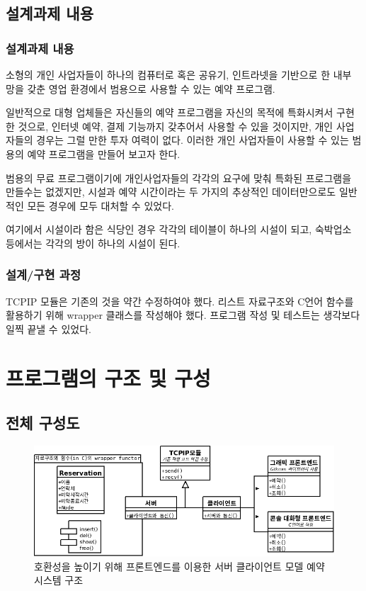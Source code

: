 \documentclass[12pt,a4paper]{report}
\begin{document}
\section{설계과제 내용}
\subsection{설계과제 내용}
소형의 개인 사업자들이 하나의 컴퓨터로 혹은 공유기, 인트라넷을 기반으로 한 내부 망을 갖춘 영업 환경에서 범용으로 사용할 수 있는 예약 프로그램.

일반적으로 대형 업체들은 자신들의 예약 프로그램을 자신의 목적에 특화시켜서 구현한 것으로, 인터넷 예약, 결제 기능까지 갖추어서 사용할 수 있을 것이지만, 개인 사업자들의 경우는 그럴 만한 투자 여력이 없다. 이러한 개인 사업자들이 사용할 수 있는 범용의 예약 프로그램을 만들어 보고자 한다.

범용의 무료 프로그램이기에 개인사업자들의 각각의 요구에 맞춰 특화된 프로그램을 만들수는 없겠지만, 시설과 예약 시간이라는 두 가지의 추상적인 데이터만으로도 일반적인 모든 경우에 모두 대처할 수 있었다.

여기에서 시설이라 함은 식당인 경우 각각의 테이블이 하나의 시설이 되고, 숙박업소 등에서는 각각의 방이 하나의 시설이 된다.

\subsection{설계/구현 과정}
TCPIP 모듈은 기존의 것을 약간 수정하여야 했다. 리스트 자료구조와 C언어 함수를 활용하기 위해 wrapper 클래스를 작성해야 했다. 프로그램 작성 및 테스트는 생각보다 일찍 끝낼 수 있었다.
\chapter{프로그램의 구조 및 구성}
\section{전체 구성도}
\begin{figure}
\includegraphics[width = \textwidth]{final2.png}
\caption{호환성을 높이기 위해 프론트엔드를 이용한 서버 클라이언트 모델 예약 시스템 구조}
\label{fig}
\end{figure}
\end{document}
